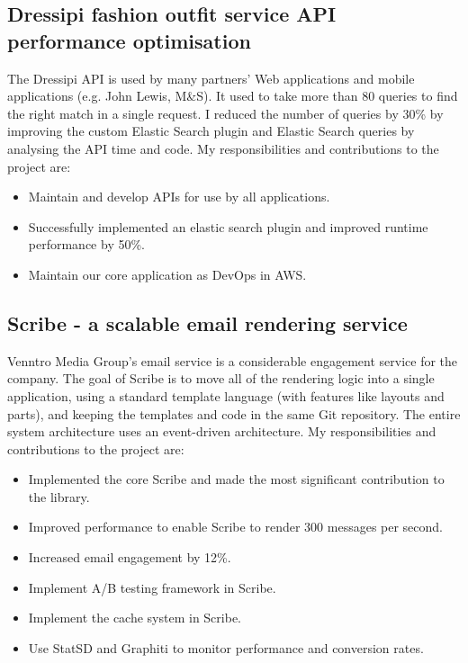 \documentclass[a4paper]{twentysecondcv-english} %
\begin{document}
\subsection{Dressipi fashion outfit service API performance optimisation}

The Dressipi API is used by many partners' Web applications and mobile applications (e.g. John Lewis, M\&S). It used to take more than 80 queries to find the right match in a single request. I reduced the number of queries by 30\% by improving the custom Elastic Search plugin and Elastic Search queries by analysing the API time and code. My responsibilities and contributions to the project are:
\begin{itemize}
    \item Maintain and develop APIs for use by all applications.
    \item Successfully implemented an elastic search plugin and improved runtime performance by 50\%.
    \item Maintain our core application as DevOps in AWS.
\end{itemize}

\subsection{Scribe - a scalable email rendering service}

Venntro Media Group's email service is a considerable engagement service for the company. The goal of Scribe is to move all of the rendering logic into a single application, using a standard template language (with features like layouts and parts), and keeping the templates and code in the same Git repository. The entire system architecture uses an event-driven architecture. My responsibilities and contributions to the project are:
\begin{itemize}
    \item Implemented the core Scribe and made the most significant contribution to the library.
    \item Improved performance to enable Scribe to render 300 messages per second.
    \item Increased email engagement by 12\%.
    \item Implement A/B testing framework in Scribe.
    \item Implement the cache system in Scribe.
    \item Use StatSD and Graphiti to monitor performance and conversion rates.
\end{itemize}
\end{document}
